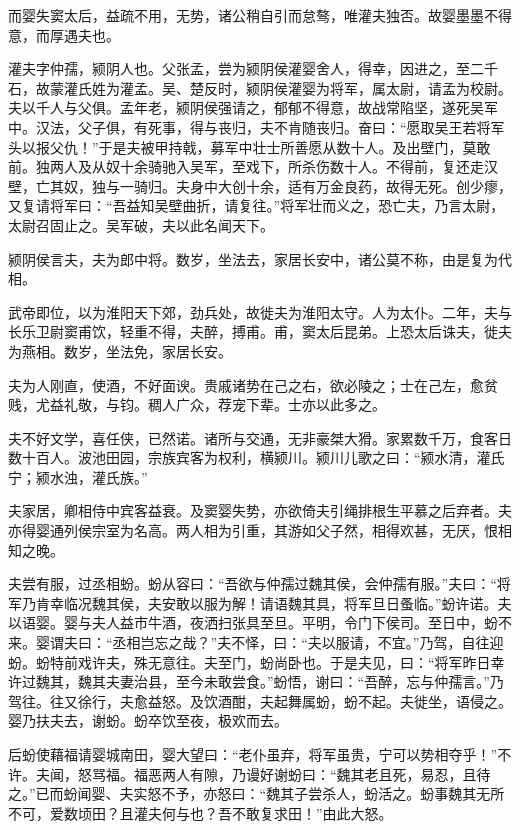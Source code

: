 \documentclass[]{article}
\begin{document}
而婴失窦太后，益疏不用，无势，诸公稍自引而怠骜，唯灌夫独否。故婴墨墨不得意，而厚遇夫也。

灌夫字仲孺，颍阴人也。父张孟，尝为颍阴侯灌婴舍人，得幸，因进之，至二千石，故蒙灌氏姓为灌孟。吴、楚反时，颍阴侯灌婴为将军，属太尉，请孟为校尉。夫以千人与父俱。孟年老，颍阴侯强请之，郁郁不得意，故战常陷坚，遂死吴军中。汉法，父子俱，有死事，得与丧归，夫不肯随丧归。奋曰：``愿取吴王若将军头以报父仇！''于是夫被甲持戟，募军中壮士所善愿从数十人。及出壁门，莫敢前。独两人及从奴十余骑驰入吴军，至戏下，所杀伤数十人。不得前，复还走汉壁，亡其奴，独与一骑归。夫身中大创十余，适有万金良药，故得无死。创少瘳，又复请将军曰：``吾益知吴壁曲折，请复往。''将军壮而义之，恐亡夫，乃言太尉，太尉召固止之。吴军破，夫以此名闻天下。

颍阴侯言夫，夫为郎中将。数岁，坐法去，家居长安中，诸公莫不称，由是复为代相。

武帝即位，以为淮阳天下郊，劲兵处，故徙夫为淮阳太守。人为太仆。二年，夫与长乐卫尉窦甫饮，轻重不得，夫醉，搏甫。甫，窦太后昆弟。上恐太后诛夫，徙夫为燕相。数岁，坐法免，家居长安。

夫为人刚直，使酒，不好面谀。贵戚诸势在己之右，欲必陵之；士在己左，愈贫贱，尤益礼敬，与钧。稠人广众，荐宠下辈。士亦以此多之。

夫不好文学，喜任侠，已然诺。诸所与交通，无非豪桀大猾。家累数千万，食客日数十百人。波池田园，宗族宾客为权利，横颍川。颍川儿歌之曰：``颍水清，灌氏宁；颍水浊，灌氏族。''

夫家居，卿相侍中宾客益衰。及窦婴失势，亦欲倚夫引绳排根生平慕之后弃者。夫亦得婴通列侯宗室为名高。两人相为引重，其游如父子然，相得欢甚，无厌，恨相知之晚。

夫尝有服，过丞相蚡。蚡从容曰：``吾欲与仲孺过魏其侯，会仲孺有服。''夫曰：``将军乃肯幸临况魏其侯，夫安敢以服为解！请语魏其具，将军旦日蚤临。''蚡许诺。夫以语婴。婴与夫人益市牛酒，夜洒扫张具至旦。平明，令门下侯司。至日中，蚡不来。婴谓夫曰：``丞相岂忘之哉？''夫不怿，曰：``夫以服请，不宜。''乃驾，自往迎蚡。蚡特前戏许夫，殊无意往。夫至门，蚡尚卧也。于是夫见，曰：``将军昨日幸许过魏其，魏其夫妻治县，至今未敢尝食。''蚡悟，谢曰：``吾醉，忘与仲孺言。''乃驾往。往又徐行，夫愈益怒。及饮酒酣，夫起舞属蚡，蚡不起。夫徙坐，语侵之。婴乃扶夫去，谢蚡。蚡卒饮至夜，极欢而去。

后蚡使藉福请婴城南田，婴大望曰：``老仆虽弃，将军虽贵，宁可以势相夺乎！''不许。夫闻，怒骂福。福恶两人有隙，乃谩好谢蚡曰：``魏其老且死，易忍，且待之。''已而蚡闻婴、夫实怒不予，亦怒曰：``魏其子尝杀人，蚡活之。蚡事魏其无所不可，爱数顷田？且灌夫何与也？吾不敢复求田！''由此大怒。
\end{document}
